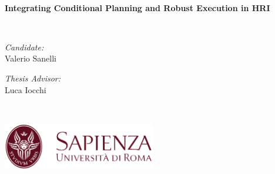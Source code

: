 \begin{titlepage}
\begin{center}




\HRule \\[0.2cm]
{\Large \bfseries Integrating Conditional Planning and Robust Execution in HRI \\[0.2cm] }

\HRule \\[0.5cm]

\noindent
\begin{minipage}[t]{0.4\textwidth}
\begin{flushleft} \large
\emph{Candidate:}\\
Valerio Sanelli\\
\end{flushleft}
\end{minipage}%
\begin{minipage}[t]{0.4\textwidth}
\begin{flushright} \large
\emph{Thesis Advisor:} \\
Luca Iocchi
\end{flushright}
\end{minipage}
\\[2cm]

\end{center}
\vfill
\begin{flushleft}
\includegraphics[width=0.5\textwidth]{images/logo.png}
\end{flushleft}


\end{titlepage}